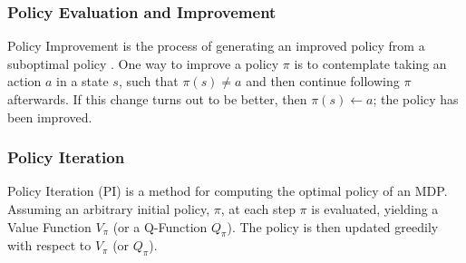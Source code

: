 

\subsubsection{Policy Evaluation and Improvement}
Policy Improvement \cite{Bellman:1957} is the process of generating an improved policy from a suboptimal policy \cite{DBLP:books/lib/Bertsekas05}. One way to improve a policy $\pi$ is to contemplate taking an action $a$ in a state $s$, such that $\pi(s) \neq a$ and then continue following $\pi$ afterwards. If this change turns out to be better, then $\pi(s) \leftarrow a$; the policy has been improved.
\subsubsection{Policy Iteration}
Policy Iteration (PI) \cite{Bellman:1957, howard:dp} is a method for computing the optimal policy of an MDP. Assuming an arbitrary initial policy, $\pi$, at each step $\pi$ is evaluated, yielding a Value Function $V_\pi$ (or a Q-Function $Q_\pi$). The policy is then updated greedily with respect to $V_\pi$ (or $Q_\pi$).
